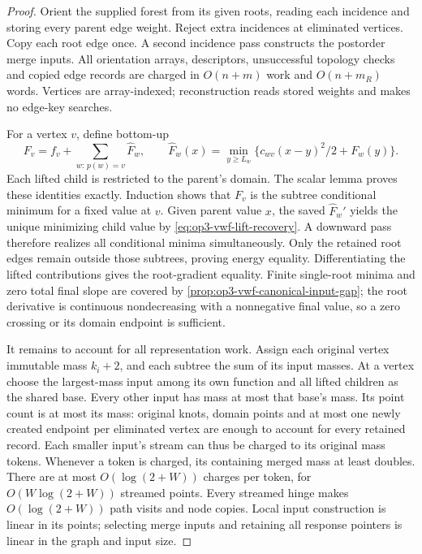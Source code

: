 \begin{proof}
Orient the supplied forest from its given roots, reading each incidence
and storing every parent edge weight. Reject extra incidences at eliminated
vertices. Copy each root edge once. A second incidence pass constructs the
postorder merge inputs. All orientation arrays, descriptors, unsuccessful
topology checks and copied edge records are charged in $O(n+m)$ work and
$O(n+m_R)$ words. Vertices are array-indexed; reconstruction reads stored
weights and makes no edge-key searches.

For a vertex $v$, define bottom-up
\[
 F_v=f_v+\sum_{w:\,p(w)=v}\widehat F_w,\qquad
 \widehat F_w(x)=\min_{y\geq L_w}
       \{c_{wv}(x-y)^2/2+F_w(y)\}.
\]
Each lifted child is restricted to the parent's domain. The scalar lemma
proves these identities exactly. Induction shows that $F_v$ is the
subtree conditional minimum for a fixed value at $v$. Given parent value
$x$, the saved $\widehat F_w'$ yields the unique minimizing child value
by \eqref{eq:op3-vwf-lift-recovery}. A downward pass therefore realizes
all conditional minima simultaneously. Only the retained root edges remain
outside those subtrees, proving energy equality. Differentiating the lifted
contributions gives the root-gradient equality. Finite single-root minima
and zero total final slope are covered by
\cref{prop:op3-vwf-canonical-input-gap}; the root derivative is continuous
nondecreasing with a nonnegative final value, so a zero crossing or its
domain endpoint is sufficient.

It remains to account for all representation work. Assign each original
vertex immutable mass $k_i+2$, and each subtree the sum of its input masses.
At a vertex choose the largest-mass input among its own function and all
lifted children as the shared base. Every other input has mass at most
that base's mass. Its point count is at most its mass: original knots,
domain points and at most one newly created endpoint per eliminated vertex
are enough to account for every retained record. Each smaller input's
stream can thus be charged to its original mass tokens. Whenever a token
is charged, its containing merged mass at least doubles. There are at most
$O(\log(2+W))$ charges per token, for $O(W\log(2+W))$ streamed points.
Every streamed hinge makes $O(\log(2+W))$ path visits and node copies.
Local input construction is linear in its points; selecting merge inputs
and retaining all response pointers is linear in the graph and input size.


\end{proof}
